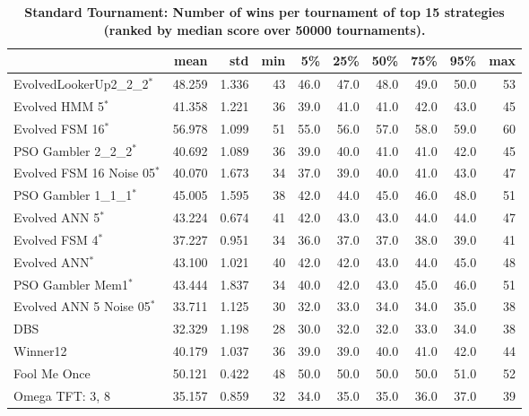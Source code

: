 \documentclass[10pt,letterpaper]{article}
\begin{document}
\begin{table}[!hbtp]
    \caption{\bf Standard Tournament: Number of wins per tournament
        of top 15 strategies (ranked by median score over
        50000 tournaments).}
        \label{tbl:standard_wins}
    \centering
    \footnotesize
\begin{tabular}{lrrrrrrrrr}
\toprule
{} &    mean &    std &  min &    5\% &   25\% &   50\% &   75\% &   95\% &  max \\
\midrule
EvolvedLookerUp2\_2\_2$^{*}$    &  48.259 &  1.336 &   43 &  46.0 &  47.0 &  48.0 &  49.0 &  50.0 &   53 \\
Evolved HMM 5$^{*}$           &  41.358 &  1.221 &   36 &  39.0 &  41.0 &  41.0 &  42.0 &  43.0 &   45 \\
Evolved FSM 16$^{*}$          &  56.978 &  1.099 &   51 &  55.0 &  56.0 &  57.0 &  58.0 &  59.0 &   60 \\
PSO Gambler 2\_2\_2$^{*}$       &  40.692 &  1.089 &   36 &  39.0 &  40.0 &  41.0 &  41.0 &  42.0 &   45 \\
Evolved FSM 16 Noise 05$^{*}$ &  40.070 &  1.673 &   34 &  37.0 &  39.0 &  40.0 &  41.0 &  43.0 &   47 \\
PSO Gambler 1\_1\_1$^{*}$       &  45.005 &  1.595 &   38 &  42.0 &  44.0 &  45.0 &  46.0 &  48.0 &   51 \\
Evolved ANN 5$^{*}$           &  43.224 &  0.674 &   41 &  42.0 &  43.0 &  43.0 &  44.0 &  44.0 &   47 \\
Evolved FSM 4$^{*}$           &  37.227 &  0.951 &   34 &  36.0 &  37.0 &  37.0 &  38.0 &  39.0 &   41 \\
Evolved ANN$^{*}$             &  43.100 &  1.021 &   40 &  42.0 &  42.0 &  43.0 &  44.0 &  45.0 &   48 \\
PSO Gambler Mem1$^{*}$        &  43.444 &  1.837 &   34 &  40.0 &  42.0 &  43.0 &  45.0 &  46.0 &   51 \\
Evolved ANN 5 Noise 05$^{*}$  &  33.711 &  1.125 &   30 &  32.0 &  33.0 &  34.0 &  34.0 &  35.0 &   38 \\
DBS                           &  32.329 &  1.198 &   28 &  30.0 &  32.0 &  32.0 &  33.0 &  34.0 &   38 \\
Winner12                      &  40.179 &  1.037 &   36 &  39.0 &  39.0 &  40.0 &  41.0 &  42.0 &   44 \\
Fool Me Once                  &  50.121 &  0.422 &   48 &  50.0 &  50.0 &  50.0 &  50.0 &  51.0 &   52 \\
Omega TFT: 3, 8               &  35.157 &  0.859 &   32 &  34.0 &  35.0 &  35.0 &  36.0 &  37.0 &   39 \\
\bottomrule
\end{tabular}
\end{table}
\end{document}
